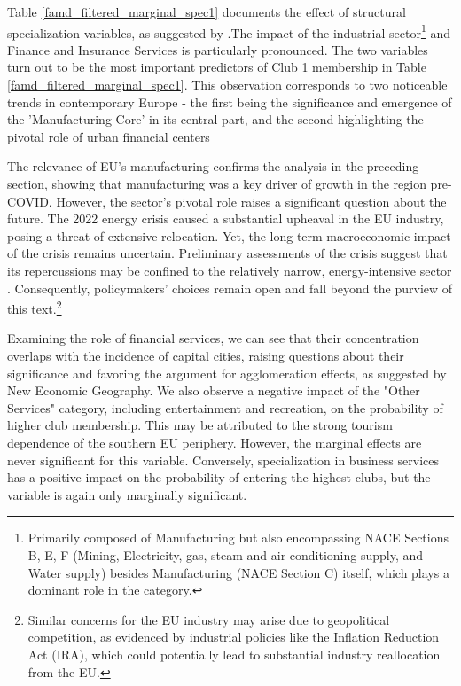 \documentclass[11pt]{article}
\begin{document}
 
Table \ref{famd_filtered_marginal_spec1} documents the effect of structural specialization variables,  as suggested by \citet{cutrini2019economic}.The impact of the industrial sector\footnote{Primarily composed of Manufacturing but also encompassing NACE Sections B, E, F (Mining, Electricity, gas, steam and air conditioning supply, and Water supply) besides Manufacturing (NACE Section C) itself, which plays a dominant role in the category.} and Finance and Insurance Services is particularly pronounced.  The two variables turn out to be the most important predictors of Club 1 membership in Table \ref{famd_filtered_marginal_spec1}. This observation corresponds to two noticeable trends in contemporary Europe - the first being the significance and emergence of the 'Manufacturing Core' in its central part, and the second highlighting the pivotal role of urban financial centers 

The relevance of EU's manufacturing confirms the analysis in the preceding section, showing that manufacturing was a key driver of growth in the region pre-COVID. However, the sector's pivotal role raises a significant question about the future. The 2022 energy crisis caused a substantial upheaval in the EU industry, posing a threat of extensive relocation. Yet, the long-term macroeconomic impact of the crisis remains uncertain. Preliminary assessments of the crisis suggest that its repercussions may be confined to the relatively narrow, energy-intensive sector \citep{sgaravatti2023adjusting}. Consequently, policymakers' choices remain open and fall beyond the purview of this text.\footnote{Similar concerns for the EU industry may arise due to geopolitical competition, as evidenced by industrial policies like the Inflation Reduction Act (IRA), which could potentially lead to substantial industry reallocation from the EU.}

Examining the role of financial services, we can see that their concentration overlaps with the incidence of capital cities, raising questions about their significance and favoring the argument for agglomeration effects, as suggested by New Economic Geography.
We also observe a negative impact of the "Other Services" category, including entertainment and recreation, on the probability of  higher club membership. This may be attributed to the strong tourism dependence of the southern EU periphery. However, the marginal effects are never significant for this variable. Conversely, specialization in business services has a positive impact on the probability of entering the highest clubs, but the variable is again only marginally significant.
\end{document}

